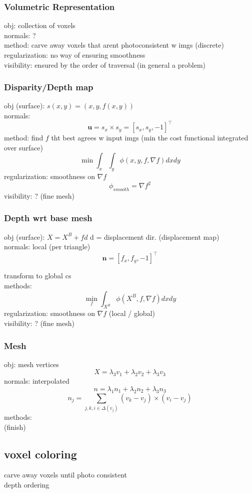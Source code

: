 \documentclass{article}
\begin{document}
\subsubsection{Volumetric Representation}
obj: collection of voxels\\
normals: ?\\
method: carve away voxels that arent photoconsistent w imgs (discrete)\\
regularization: no way of ensuring smoothness
\\
visibility: ensured by the order of traversal (in general a problem)

\subsubsection{Disparity/Depth map}
obj (surface): $s(x,y) = (x,y,f(x,y))$
\\
normals: \[
  \mathbf u = s_x \times s_y = [s_x, s_y, -1]^\top
\]
method: find $f$ tht best agrees w input imgs (min the cost functional integrated over surface)
\[
  \min \int_x\int_y \phi (x,y,f,\nabla f) dxdy
\]
regularization: smoothness on $\nabla f$
\[
  \phi_{smooth} = \nabla f^2
\]
visibility: ? (fine mesh)


\subsubsection{Depth wrt base mesh}
obj (surface): $X=X^B + fd$ d = displacement dir. (displacement map)
\\
normals: local (per triangle)
\[
  \mathbf n = [f_x, f_y, -1]^\top 
\]

transform to global cs
\\
methods: 
\[
  \min_f \int_{X^B} \phi (X^B, f, \nabla f)dxdy
\]
regularization: smoothness on $\nabla f$ (local / global)
\\
visibility: ? (fine mesh)


\subsubsection{Mesh}
obj: mesh vertices
\[
  X = \lambda_3 v_1 + \lambda_2 v_2 + \lambda _3 v_3
\]
normals: interpolated
\[
  n = \lambda_1 n_1 + \lambda _2 n_2 + \lambda_3 n_3
\]
\[
  n_j = \sum_{j,k,i\in\Delta (v_j)} (v_k - v_j) \times (v_i - v_j)
\]
methods:
\\
(finish)

\subsection{voxel coloring}
carve away voxels until photo consistent\\
depth ordering
\end{document}
